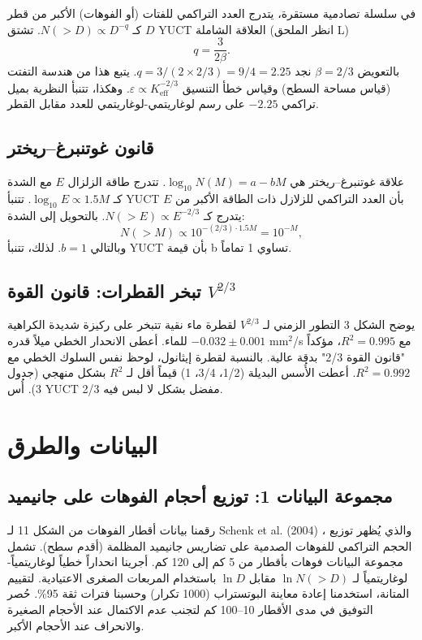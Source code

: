 \documentclass[11pt,a4paper]{article}
\newcommand{\eps}{\varepsilon}
\newcommand{\Keff}{K_{\mathrm{eff}}}
\newcommand{\betaf}{\beta}
\begin{document}
	في سلسلة تصادمية مستقرة، يتدرج العدد التراكمي للفتات (أو الفوهات) الأكبر من قطر \(D\) كـ \(N(>D) \propto D^{-q}\). تشتق YUCT العلاقة الشاملة (انظر الملحق L)
	\[
	q = \frac{3}{2\betaf}.
	\]
	بالتعويض \(\betaf = 2/3\) نجد \(q = 3/(2 \times 2/3) = 9/4 = 2.25\). يتبع هذا من هندسة التفتت (قياس مساحة السطح) وقياس خطأ التنسيق \(\eps \propto \Keff^{-2/3}\). وهكذا، تتنبأ النظرية بميل تراكمي \(-2.25\) على رسم لوغاريتمي-لوغاريتمي للعدد مقابل القطر.
	
	\subsection{قانون غوتنبرغ–ريختر}
	
	علاقة غوتنبرغ–ريختر \cite{GutenbergRichter1954} هي \(\log_{10} N(M) = a - b M\). تتدرج طاقة الزلزال \(E\) مع الشدة كـ \(\log_{10} E \propto 1.5 M\). تتنبأ YUCT بأن العدد التراكمي للزلازل ذات الطاقة الأكبر من \(E\) يتدرج كـ \(N(>E) \propto E^{-2/3}\). بالتحويل إلى الشدة:
	\[
	N(>M) \propto 10^{-(2/3) \cdot 1.5 M} = 10^{-M},
	\]
	وبالتالي \(b = 1\). لذلك، تتنبأ YUCT بأن قيمة b تساوي 1 تماماً.
	
	\subsection{تبخر القطرات: قانون القوة \(V^{2/3}\)}
	
	يوضح الشكل 3 التطور الزمني لـ \(V^{2/3}\) لقطرة ماء نقية تتبخر على ركيزة شديدة الكراهية للماء. أعطى الانحدار الخطي ميلاً قدره \(-0.032 \pm 0.001\) mm\(^2\)/s مع \(R^2 = 0.995\)، مؤكداً "قانون القوة 2/3" بدقة عالية. بالنسبة لقطرة إيثانول، لوحظ نفس السلوك الخطي مع \(R^2 = 0.992\). أعطت الأُسس البديلة (1/2، 3/4، 1) قيماً أقل لـ \(R^2\) بشكل منهجي (جدول 3). أُس YUCT 2/3 مفضل بشكل لا لبس فيه.
	
	\section{البيانات والطرق}
	
	\subsection{مجموعة البيانات 1: توزيع أحجام الفوهات على جانيميد}
	
	رقمنا بيانات أقطار الفوهات من الشكل 11 لـ Schenk et al. (2004) \cite{Schenk2004}، والذي يُظهر توزيع الحجم التراكمي للفوهات الصدمية على تضاريس جانيميد المظلمة (أقدم سطح). تشمل مجموعة البيانات فوهات بأقطار من 5 كم إلى 120 كم. أجرينا انحداراً خطياً لوغاريتمياً-لوغاريتمياً لـ \(\ln N(>D)\) مقابل \(\ln D\) باستخدام المربعات الصغرى الاعتيادية. لتقييم المتانة، استخدمنا إعادة معاينة البوتستراب (1000 تكرار) وحسبنا فترات ثقة 95\%. حُصر التوفيق في مدى الأقطار 10–100 كم لتجنب عدم الاكتمال عند الأحجام الصغيرة والانحراف عند الأحجام الأكبر.
	
\end{document}

